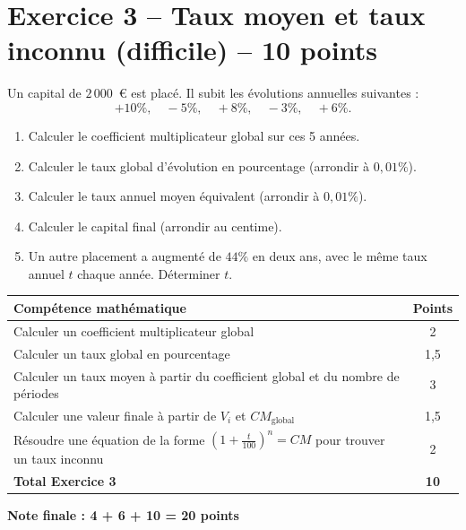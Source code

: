 \documentclass[12pt,a4paper]{article}
\begin{document}
\section*{Exercice 3 -- Taux moyen et taux inconnu (difficile) -- 10 points}

Un capital de \(2\,000\)~\euro{} est placé. Il subit les évolutions annuelles suivantes :
\[
+10\%,\quad -5\%,\quad +8\%,\quad -3\%,\quad +6\%.
\]

\begin{enumerate}[label=\textbf{\arabic*.}]
    \item Calculer le coefficient multiplicateur global sur ces 5 années.
    \item Calculer le taux global d'évolution en pourcentage (arrondir à \(0{,}01\%\)).
    \item Calculer le taux annuel moyen équivalent (arrondir à \(0{,}01\%\)).
    \item Calculer le capital final (arrondir au centime).
    \item Un autre placement a augmenté de \(44\%\) en deux ans, avec le même taux annuel \(t\) chaque année. Déterminer \(t\).
\end{enumerate}

\begin{center}
\renewcommand{\arraystretch}{1.5}
\begin{tabular}{>{\raggedright\arraybackslash}p{10.5cm} c}
\hline
\textbf{Compétence mathématique} & \textbf{Points} \\
\hline
Calculer un coefficient multiplicateur global & 2 \\
\hline
Calculer un taux global en pourcentage & 1{,}5 \\
\hline
Calculer un taux moyen à partir du coefficient global et du nombre de périodes & 3 \\
\hline
Calculer une valeur finale à partir de \(V_i\) et \(CM_{\text{global}}\) & 1{,}5 \\
\hline
Résoudre une équation de la forme \(\left(1+\frac{t}{100}\right)^n = CM\) pour trouver un taux inconnu & 2 \\
\hline
\textbf{Total Exercice 3} & \textbf{10} \\
\hline
\end{tabular}
\end{center}

\vspace{0.5cm}
\begin{center}
\textbf{Note finale : 4 + 6 + 10 = 20 points}
\end{center}
\end{document}

